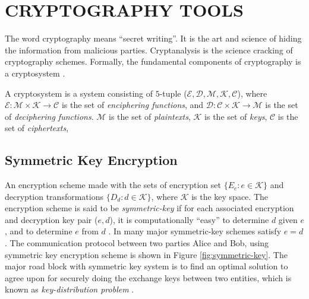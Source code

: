 \chapter{CRYPTOGRAPHY TOOLS} %
\label{cha:Cryptography tools}

	The word cryptography means ``secret writing''.
	It is the art and science of hiding the information from malicious parties.
	Cryptanalysis is the science cracking of cryptography schemes.
	Formally, the fundamental components of cryptography is a cryptosystem \cite{bishop2004introduction}.
	\begin{definition}
		A cryptosystem is a system consisting of $5$-tuple ($ \mathcal{E,D,M,K,C}$), 
		where $\mathcal{E}:\mathcal{M} \times \mathcal{K} \rightarrow \mathcal{C}$ is the set of \textit{enciphering functions}, and $\mathcal{D}:\mathcal{C} \times \mathcal{K} \rightarrow \mathcal{M}$ is the set of \textit{deciphering functions}.
		$\mathcal{M}$ is the set of \textit{plaintexts},
		$\mathcal{K}$ is the set of \textit{keys},
		$\mathcal{C}$ is the set of \textit{ciphertexts},
	\end{definition}

\section{Symmetric Key Encryption}
	An encryption scheme made with the sets of encryption set $\{E_{e}: e \in \mathcal{K}\}$ and decryption transformations $\{D_{d}: d \in \mathcal{K}\}$, where $\mathcal{K}$ is the key space.
	The encryption scheme is said to be \textit{symmetric-key} if for each associated encryption and decryption key pair ($e,d$), it is computationally ``easy'' to determine $d$ given $e$, and to determine $e$ from $d$ \cite{menezes2010handbook}.
	In many major symmetric-key schemes satisfy $e = d$.
	The communication protocol between two parties Alice and Bob, using symmetric key encryption scheme is shown in Figure \ref{fig:symmetric-key}. 
	The major road block with symmetric key system is to find an optimal solution to agree upon for securely doing the exchange keys between two entities, which is known as \textit{key-distribution problem} \cite{menezes2010handbook}. 

